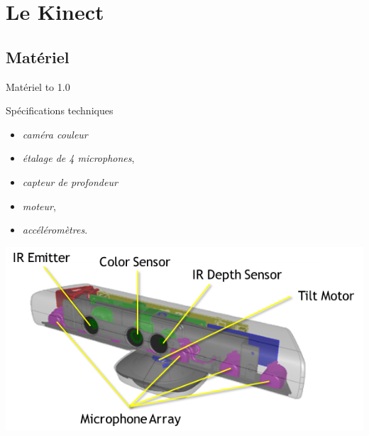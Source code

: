 \section{Le Kinect}

\begin{frame}
\end{frame}

\subsection{Matériel}
\begin{frame}{Matériel}
\vbox to 1.0\textheight
{
\begin{block}{Spécifications techniques~\cite{kinect_msdn}\cite{wiki_kinect}}
  \begin{minipage}[t]{0.49\linewidth}
    \begin{itemize}
    \item<1-> \emph{caméra couleur}
    \item<2-> \emph{étalage de 4 microphones},
    \end{itemize}
  \end{minipage} 
  \begin{minipage}[t]{0.49\linewidth}
    \begin{itemize}
    \item<3-> \emph{capteur de profondeur}
    \item<4-> \emph{moteur},
    \item<4-> \emph{accéléromètres}.
    \end{itemize}
  \end{minipage}
\end{block}
  \begin{center}
    \includegraphics[height=0.4\textheight]{../images/kinect_specs}
  \end{center}
  \vfill
}
\end{frame}

